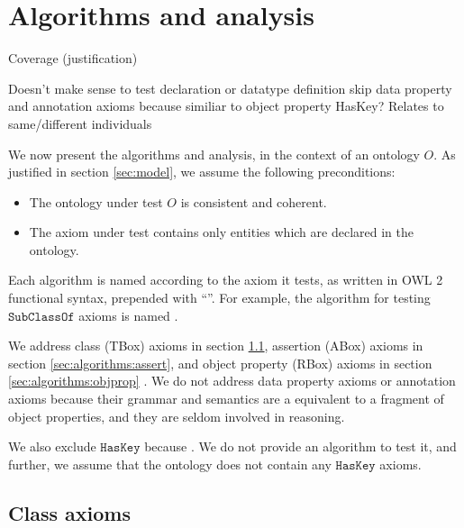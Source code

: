 \documentclass[paper.tex]{subfiles}
\begin{document}
\section{Algorithms and analysis}
\label{sec:algorithms}

\begin{todos}
  \todo Coverage (justification)
  \begin{todos}
    \todo Doesn't make sense to test declaration or data\-type definition
    \todo skip data property and annotation axioms because similiar to object property
    \todo HasKey?  Relates to same/different individuals
  \end{todos}
\end{todos}

We now present the algorithms and analysis, in the context of an ontology $O$.  As justified in section \ref{sec:model}, we assume the following preconditions:
\begin{itemize}[nosep]
  \item The ontology under test $O$ is consistent and coherent.
  \item The axiom under test contains only entities which are declared in the ontology.
\end{itemize}

Each algorithm is named according to the axiom it tests, as written in OWL 2 functional syntax, prepended with ``''.  For example, the algorithm for testing $\mathtt{SubClassOf}$ axioms is named .

We address class (TBox) axioms in section \ref{sec:algorithms:class}, assertion (ABox) axioms in section \ref{sec:algorithms:assert}, and object property (RBox) axioms in section \ref{sec:algorithms:objprop} \todo[TBC].  We do not address data property axioms or annotation axioms because their grammar and semantics are a equivalent to a fragment of object properties, and they are seldom involved in reasoning.

We also exclude $\mathtt{HasKey}$ because  \todo[cite].  We do not provide an algorithm to test it, and further, we assume that the ontology does not contain any $\mathtt{HasKey}$ axioms.

\subsection{Class axioms}
\label{sec:algorithms:class}
\end{document}
